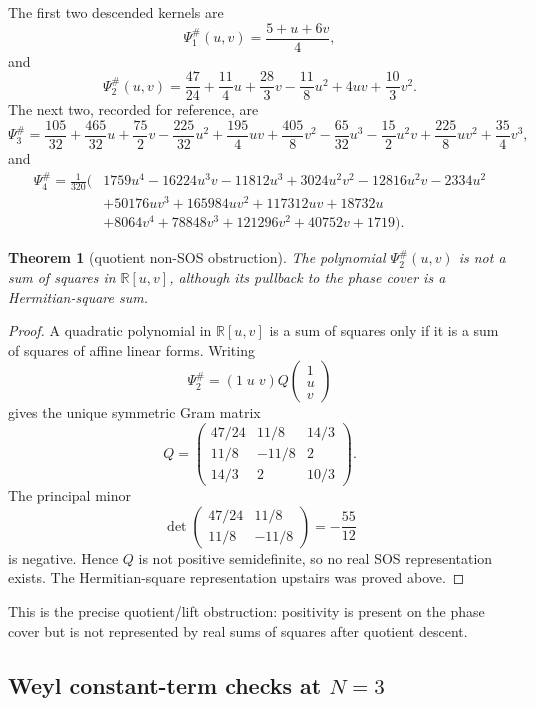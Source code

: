 \documentclass[11pt]{article}
\newtheorem{theorem}{Theorem}[section]
\newcommand{\R}{\mathbb R}
\begin{document}
The first two descended kernels are
\[
\Psi_1^\#(u,v)=\frac{5+u+6v}{4},
\]
and
\[
\Psi_2^\#(u,v)=\frac{47}{24}+\frac{11}{4}u+\frac{28}{3}v-
\frac{11}{8}u^2+4uv+\frac{10}{3}v^2.
\]
The next two, recorded for reference, are
\[
\Psi_3^\#=\frac{105}{32}+\frac{465}{32}u+\frac{75}{2}v-\frac{225}{32}u^2+
\frac{195}{4}uv+\frac{405}{8}v^2-\frac{65}{32}u^3-\frac{15}{2}u^2v+
\frac{225}{8}uv^2+\frac{35}{4}v^3,
\]
and
\[
\begin{aligned}
\Psi_4^\#=\frac1{320}(&1759u^4-16224u^3v-11812u^3+3024u^2v^2
-12816u^2v-2334u^2\\
&+50176uv^3+165984uv^2+117312uv+18732u\\
&+8064v^4+78848v^3+121296v^2+40752v+1719).
\end{aligned}
\]

\begin{theorem}[quotient non-SOS obstruction]
The polynomial $\Psi_2^\#(u,v)$ is not a sum of squares in $\R[u,v]$, although its
pullback to the phase cover is a Hermitian-square sum.
\end{theorem}

\begin{proof}
A quadratic polynomial in $\R[u,v]$ is a sum of squares only if it is a sum of
squares of affine linear forms.  Writing
\[
\Psi_2^\#=(1\;u\;v)
Q
\begin{pmatrix}1\\u\\v\end{pmatrix}
\]
gives the unique symmetric Gram matrix
\[
Q=\begin{pmatrix}
47/24 & 11/8 & 14/3\\
11/8 & -11/8 & 2\\
14/3 & 2 & 10/3
\end{pmatrix}.
\]
The principal minor
\[
\det\begin{pmatrix}47/24&11/8\\ 11/8&-11/8\end{pmatrix}=-\frac{55}{12}
\]
is negative.  Hence $Q$ is not positive semidefinite, so no real SOS representation
exists.  The Hermitian-square representation upstairs was proved above.
\end{proof}

This is the precise quotient/lift obstruction: positivity is present on the phase cover
but is not represented by real sums of squares after quotient descent.

\subsection{Weyl constant-term checks at $N=3$}
\end{document}
